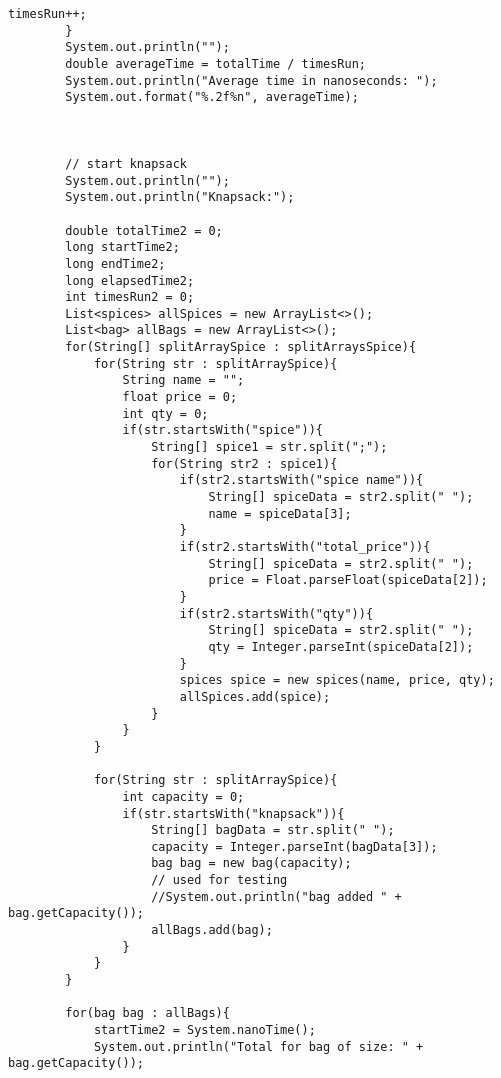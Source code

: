 \documentclass[10pt]{article}
\begin{document}
\begin{lstlisting}[frame=single, ]
            timesRun++;
        }
        System.out.println("");
        double averageTime = totalTime / timesRun;
        System.out.println("Average time in nanoseconds: ");
        System.out.format("%.2f%n", averageTime);


        
        // start knapsack
        System.out.println("");
        System.out.println("Knapsack:");

        double totalTime2 = 0;
        long startTime2;
        long endTime2;
        long elapsedTime2;
        int timesRun2 = 0;
        List<spices> allSpices = new ArrayList<>();
        List<bag> allBags = new ArrayList<>();
        for(String[] splitArraySpice : splitArraysSpice){
            for(String str : splitArraySpice){
                String name = "";
                float price = 0;
                int qty = 0;
                if(str.startsWith("spice")){
                    String[] spice1 = str.split(";");
                    for(String str2 : spice1){
                        if(str2.startsWith("spice name")){
                            String[] spiceData = str2.split(" ");
                            name = spiceData[3];
                        }
                        if(str2.startsWith("total_price")){
                            String[] spiceData = str2.split(" ");
                            price = Float.parseFloat(spiceData[2]);
                        }
                        if(str2.startsWith("qty")){
                            String[] spiceData = str2.split(" ");
                            qty = Integer.parseInt(spiceData[2]);
                        }
                        spices spice = new spices(name, price, qty);
                        allSpices.add(spice);
                    }
                }
            }

            for(String str : splitArraySpice){
                int capacity = 0;
                if(str.startsWith("knapsack")){
                    String[] bagData = str.split(" ");
                    capacity = Integer.parseInt(bagData[3]);
                    bag bag = new bag(capacity);
                    // used for testing
                    //System.out.println("bag added " + bag.getCapacity());
                    allBags.add(bag);
                }
            }
        }

        for(bag bag : allBags){
            startTime2 = System.nanoTime();
            System.out.println("Total for bag of size: " + bag.getCapacity());


\end{lstlisting}
\end{document}
